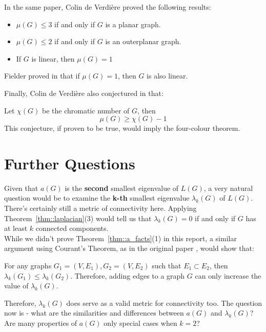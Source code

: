 \documentclass{article}
\begin{document}
\begin{theorem}
In the same paper, Colin de Verdière proved the following results:
\begin{itemize}
    \item $\mu(G) \leq 3$ if and only if $G$ is a planar graph.
    \item $\mu(G) \leq 2$ if and only if $G$ is an outerplanar graph.
    \item If $G$ is linear, then $\mu(G) = 1$
\end{itemize}
Fielder proved in \cite{fiedler_1969} that if $\mu(G) = 1$, then $G$ is also linear.
\end{theorem}

Finally, Colin de Verdière also conjectured in \cite{de_verdière_1990} that:

\begin{conjecture}
    Let $\chi(G)$ be the chromatic number of $G$, then
    \[\mu(G) \geq \chi(G) - 1\]
    This conjecture, if proven to be true, would imply the four-colour theorem.
\end{conjecture}

\newpage
\section{Further Questions}

Given that $a(G)$ is the \textbf{second} smallest eigenvalue of $L(G)$, a very natural question would be to examine the \textbf{k-th} smallest eigenvalue $\lambda_k(G)$ of $L(G)$.\\

There's certainly still a metric of connectivity here. Applying Theorem~\ref{thm::laplacian}(3) would tell us that $\lambda_k(G) = 0$ if and only if $G$ has at least $k$ connected components.\\

While we didn't prove Theorem~\ref{thm::a_facts}(1) in this report, a similar argument using Courant's Theorem, as in the original paper \cite{MiroslavFiedler1989}, would show that:

\begin{theorem}
    For any graphs $G_1 = (V, E_1), G_2 = (V, E_2)$ such that $E_1 \subset E_2$, then $\lambda_k(G_1) \leq \lambda_k(G_2)$. Therefore, adding edges to a graph $G$ can only increase the value of $\lambda_k(G)$.
\end{theorem}

Therefore, $\lambda_k(G)$ does serve as a valid metric for connectivity too. The question now is - what are the similarities and differences between $a(G)$ and $\lambda_k(G)$? Are many properties of $a(G)$ only special cases when $k = 2$?\\
\end{document}
